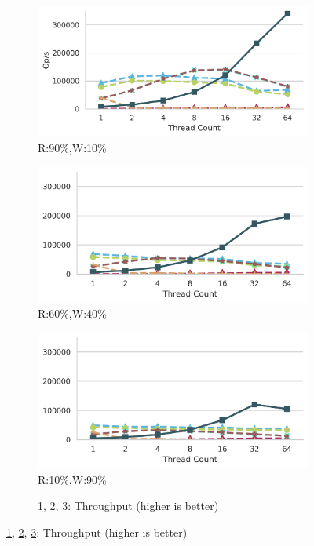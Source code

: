 \begin{figure}[ht]
	\centering
	\captionsetup{justification=centering}
	\begin{subfigure}{.33\textwidth}
		\includegraphics[width=\textwidth]{figures/PerformanceCharts/ReadWithoutModificationsThroughput}
		\caption{R:90\%,W:10\%}
		\label{rwm}
	\end{subfigure}
	\begin{subfigure}{.32\textwidth}
		\includegraphics[width=\textwidth]{figures/PerformanceCharts/BalancedWithoutModificationsThroughput}
		\caption{R:60\%,W:40\%}
		\label{bwm}
	\end{subfigure}
	\begin{subfigure}{.32\textwidth}
		\includegraphics[width=\textwidth]{figures/PerformanceCharts/WriteWithoutModificationsThroughput}
		\caption{R:10\%,W:90\%}
		\label{wwm}
	\end{subfigure}
	\begin{subfigure}[b]{\textwidth}
		\caption*{\ref{rwm}, \ref{bwm}, \ref{wwm}: Throughput (higher is better)}
	\end{subfigure}



\end{figure}
